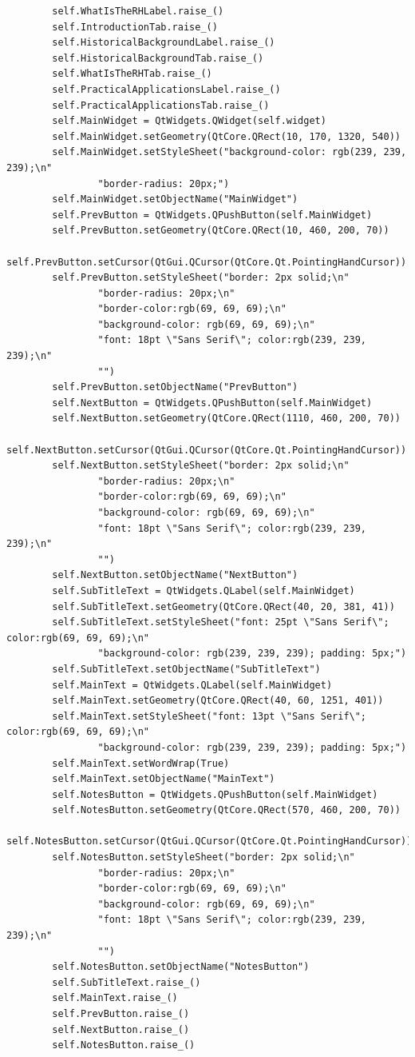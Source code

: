 \documentclass[12pt]{article}
\begin{document}
\begin{lstlisting}
        self.WhatIsTheRHLabel.raise_()
        self.IntroductionTab.raise_()
        self.HistoricalBackgroundLabel.raise_()
        self.HistoricalBackgroundTab.raise_()
        self.WhatIsTheRHTab.raise_()
        self.PracticalApplicationsLabel.raise_()
        self.PracticalApplicationsTab.raise_()
        self.MainWidget = QtWidgets.QWidget(self.widget)
        self.MainWidget.setGeometry(QtCore.QRect(10, 170, 1320, 540))
        self.MainWidget.setStyleSheet("background-color: rgb(239, 239, 239);\n"
                "border-radius: 20px;")
        self.MainWidget.setObjectName("MainWidget")
        self.PrevButton = QtWidgets.QPushButton(self.MainWidget)
        self.PrevButton.setGeometry(QtCore.QRect(10, 460, 200, 70))
        self.PrevButton.setCursor(QtGui.QCursor(QtCore.Qt.PointingHandCursor))
        self.PrevButton.setStyleSheet("border: 2px solid;\n"
                "border-radius: 20px;\n"
                "border-color:rgb(69, 69, 69);\n"
                "background-color: rgb(69, 69, 69);\n"
                "font: 18pt \"Sans Serif\"; color:rgb(239, 239, 239);\n"
                "")
        self.PrevButton.setObjectName("PrevButton")
        self.NextButton = QtWidgets.QPushButton(self.MainWidget)
        self.NextButton.setGeometry(QtCore.QRect(1110, 460, 200, 70))
        self.NextButton.setCursor(QtGui.QCursor(QtCore.Qt.PointingHandCursor))
        self.NextButton.setStyleSheet("border: 2px solid;\n"
                "border-radius: 20px;\n"
                "border-color:rgb(69, 69, 69);\n"
                "background-color: rgb(69, 69, 69);\n"
                "font: 18pt \"Sans Serif\"; color:rgb(239, 239, 239);\n"
                "")
        self.NextButton.setObjectName("NextButton")
        self.SubTitleText = QtWidgets.QLabel(self.MainWidget)
        self.SubTitleText.setGeometry(QtCore.QRect(40, 20, 381, 41))
        self.SubTitleText.setStyleSheet("font: 25pt \"Sans Serif\"; color:rgb(69, 69, 69);\n"
                "background-color: rgb(239, 239, 239); padding: 5px;")
        self.SubTitleText.setObjectName("SubTitleText")
        self.MainText = QtWidgets.QLabel(self.MainWidget)
        self.MainText.setGeometry(QtCore.QRect(40, 60, 1251, 401))
        self.MainText.setStyleSheet("font: 13pt \"Sans Serif\"; color:rgb(69, 69, 69);\n"
                "background-color: rgb(239, 239, 239); padding: 5px;")
        self.MainText.setWordWrap(True)
        self.MainText.setObjectName("MainText")
        self.NotesButton = QtWidgets.QPushButton(self.MainWidget)
        self.NotesButton.setGeometry(QtCore.QRect(570, 460, 200, 70))
        self.NotesButton.setCursor(QtGui.QCursor(QtCore.Qt.PointingHandCursor))
        self.NotesButton.setStyleSheet("border: 2px solid;\n"
                "border-radius: 20px;\n"
                "border-color:rgb(69, 69, 69);\n"
                "background-color: rgb(69, 69, 69);\n"
                "font: 18pt \"Sans Serif\"; color:rgb(239, 239, 239);\n"
                "")
        self.NotesButton.setObjectName("NotesButton")
        self.SubTitleText.raise_()
        self.MainText.raise_()
        self.PrevButton.raise_()
        self.NextButton.raise_()
        self.NotesButton.raise_()


\end{lstlisting}
\end{document}
